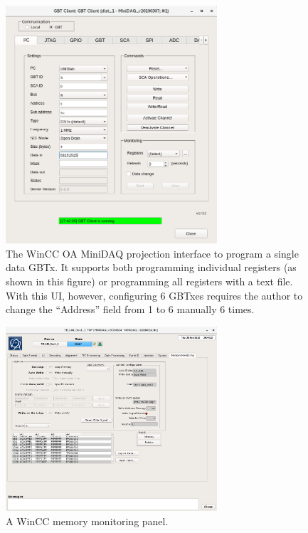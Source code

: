 \begin{figure}[!htb]
    \centering
    \includegraphics[width=0.7\textwidth]{./figs-ut-upgrade/online/gbt_client_slave_gbt_i2c_test.png}
    \caption{
        The WinCC OA MiniDAQ projection interface to program a single data GBTx.
        It supports both programming individual registers (as shown in this
        figure) or programming all registers with a text file.
        With this UI, however, configuring 6 GBTxes requires the author
        to change the ``Address'' field from 1 to 6 manually 6 times.
    }
    \label{fig:wincc-oa-gbt}
\end{figure}

\begin{figure}[!htb]
    \centering
    \includegraphics[width=0.7\textwidth]{./figs-ut-upgrade/online/memory_monitoring_panel.png}
    \caption{
        A WinCC memory monitoring panel.
    }
    \label{fig:wincc-oa-memmon}
\end{figure}


